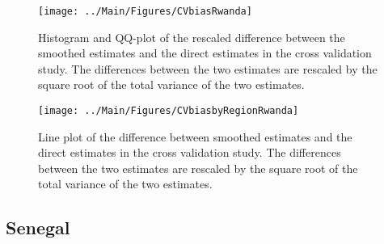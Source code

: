 \documentclass[12pt]{article}\usepackage[]{graphicx}\usepackage[]{color}
\newenvironment{knitrout}{}{} %
\begin{document}
\begin{knitrout}
\color{fgcolor}\begin{figure}[bht]

{\centering \texttt{[image: ../Main/Figures/CVbiasRwanda]} 

}

\caption[Histogram and QQ-plot of the rescaled difference between the smoothed estimates and the direct estimates in the cross validation study]{Histogram and QQ-plot of the rescaled difference between the smoothed estimates and the direct estimates in the cross validation study. The differences between the two estimates are rescaled by the square root of the total variance of the two estimates.}\label{fig:unnamed-chunk-279}
\end{figure}


\end{knitrout}

\begin{knitrout}
\color{fgcolor}\begin{figure}[bht]

{\centering \texttt{[image: ../Main/Figures/CVbiasbyRegionRwanda]} 

}

\caption[Line plot of the difference between smoothed estimates and the direct estimates in the cross validation study]{Line plot of the difference between smoothed estimates and the direct estimates in the cross validation study. The differences between the two estimates are rescaled by the square root of the total variance of the two estimates.}\label{fig:unnamed-chunk-280}
\end{figure}


\end{knitrout}


\clearpage
\subsection{Senegal}


\end{document}
